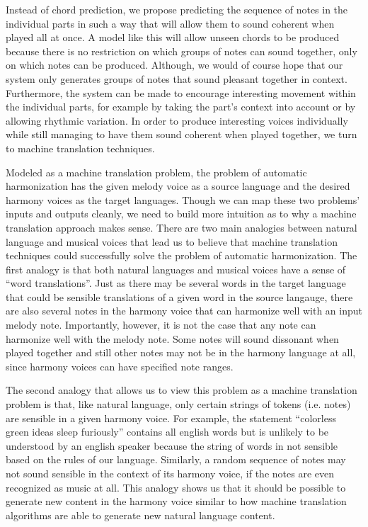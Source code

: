\documentclass{sig-alternate}
\begin{document}
Instead of chord prediction, we propose predicting the sequence of notes in the individual parts in such a way that will allow them to sound coherent when played all at once. A model like this will allow unseen chords to be produced because there is no restriction on which groups of notes can sound together, only on which notes can be produced. Although, we would of course hope that our system only generates groups of notes that sound pleasant together in context. Furthermore, the system can be made to encourage interesting movement within the individual parts, for example by taking the part's context into account or by allowing rhythmic variation. In order to produce interesting voices individually while still managing to have them sound coherent when played together, we turn to machine translation techniques.

Modeled as a machine translation problem, the problem of automatic harmonization has the given melody voice as a source language 
and the desired harmony voices as the target languages. Though we can map these two problems' inputs and outputs cleanly, we
need to build more intuition as to why a machine translation approach makes sense. There are two main analogies between natural language and musical voices that lead us to believe that machine translation techniques could successfully solve the problem of automatic harmonization. The first analogy is that both natural languages and musical voices have a sense of ``word translations''. Just as there may be several words in the target language that could be sensible translations of a given word in the source 
langauge, there are also several notes in the harmony voice that can harmonize well with an input melody note. Importantly, 
however, it is not the case that any note can harmonize well with the melody note. Some notes will sound dissonant when played together and still other notes may not be in the harmony language at all, since harmony voices can have specified note
ranges. 

The second analogy that allows us to view this problem as a machine translation problem is that, like 
natural language, only certain strings of tokens (i.e. notes) are sensible in a given harmony voice. For example,
the statement ``colorless green ideas sleep furiously'' contains all english words but is unlikely to
be understood by an english speaker because the string of words in not sensible based on the rules of our
language. Similarly, a random sequence of notes may not sound sensible in the context of its
harmony voice, if the notes are even recognized as music at all. This analogy shows us that it should be
possible to generate new content in the harmony voice similar to how machine translation algorithms are 
able to generate new natural language content.
\end{document}
